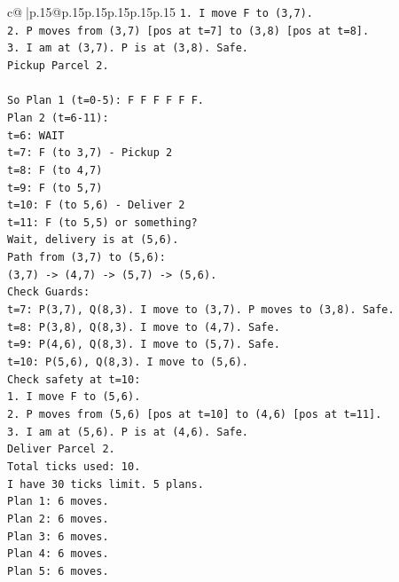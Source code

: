 \documentclass{article}
\begin{document}
{\begin{supertabular}{c@{$\;$}|p{.15\linewidth}@{}p{.15\linewidth}p{.15\linewidth}p{.15\linewidth}p{.15\linewidth}p{.15\linewidth}}
{{{\texttt{1. I move F to (3,7).} \\
\texttt{2. P moves from (3,7) {[}pos at t=7{]} to (3,8) {[}pos at t=8{]}.} \\
\texttt{3. I am at (3,7). P is at (3,8). Safe.} \\
\texttt{Pickup Parcel 2.} \\
\\ 
\texttt{So Plan 1 (t=0{-}5): F F F F F F.} \\
\texttt{Plan 2 (t=6{-}11):} \\
\texttt{t=6: WAIT} \\
\texttt{t=7: F (to 3,7) {-} Pickup 2} \\
\texttt{t=8: F (to 4,7)} \\
\texttt{t=9: F (to 5,7)} \\
\texttt{t=10: F (to 5,6) {-} Deliver 2} \\
\texttt{t=11: F (to 5,5) or something?} \\
\texttt{Wait, delivery is at (5,6).} \\
\texttt{Path from (3,7) to (5,6):} \\
\texttt{(3,7) {-}> (4,7) {-}> (5,7) {-}> (5,6).} \\
\texttt{Check Guards:} \\
\texttt{t=7: P(3,7), Q(8,3). I move to (3,7). P moves to (3,8). Safe.} \\
\texttt{t=8: P(3,8), Q(8,3). I move to (4,7). Safe.} \\
\texttt{t=9: P(4,6), Q(8,3). I move to (5,7). Safe.} \\
\texttt{t=10: P(5,6), Q(8,3). I move to (5,6).} \\
\texttt{Check safety at t=10:} \\
\texttt{1. I move F to (5,6).} \\
\texttt{2. P moves from (5,6) {[}pos at t=10{]} to (4,6) {[}pos at t=11{]}.} \\
\texttt{3. I am at (5,6). P is at (4,6). Safe.} \\
\texttt{Deliver Parcel 2.} \\
\texttt{Total ticks used: 10.} \\
\texttt{I have 30 ticks limit. 5 plans.} \\
\texttt{Plan 1: 6 moves.} \\
\texttt{Plan 2: 6 moves.} \\
\texttt{Plan 3: 6 moves.} \\
\texttt{Plan 4: 6 moves.} \\
\texttt{Plan 5: 6 moves.} \\
}}}
\end{supertabular}}
\end{document}
